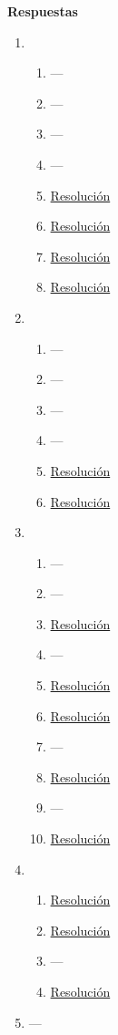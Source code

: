 \documentclass[a4paper]{article}
\newcommand{\exercise}{\item}
\begin{document}
 \textbf{Respuestas}\begin{enumerate}\exercise\begin{enumerate} [label=(\alph*)]\item ---\item ---\item ---\item ---		\item \href{https://youtu.be/DWDi7BKAKbc}{Resolución}
		\item \href{https://youtu.be/bfCWsvZfFq0}{Resolución}
		\item \href{https://youtu.be/W3HcTD4IC94}{Resolución}
		\item \href{https://youtu.be/0Dw3MAwrA34}{Resolución}
\end{enumerate}\exercise\begin{enumerate} [label=(\alph*)]\item ---\item ---\item ---\item ---		\item \href{https://youtu.be/09D5Z3dcaXc}{Resolución}
		\item \href{https://youtu.be/jE5a43IQ91E}{Resolución}
\end{enumerate}\exercise\begin{enumerate} [label=(\alph*)]\item ---\item ---		\item \href{https://youtu.be/ZMBXAdxOleM}{Resolución}
\item ---		\item \href{https://youtu.be/1V06bnuaadA}{Resolución}
		\item \href{https://youtu.be/Z1KatpJM2eU}{Resolución}
\item ---		\item \href{https://youtu.be/EQIEmdkGOZE}{Resolución}
\item ---		\item \href{https://youtu.be/BCo0pxE288w}{Resolución}
\end{enumerate}\exercise\begin{enumerate} [label=(\alph*)]		\item \href{https://youtu.be/_XVYatmUKBg}{Resolución}
		\item \href{https://youtu.be/LDpq_f-baPc}{Resolución}
\item ---		\item \href{https://youtu.be/LDpq_f-baPc}{Resolución}
\end{enumerate}\exercise---\end{enumerate}
\end{document}
